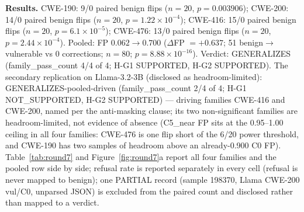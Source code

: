 \textbf{Results.} CWE-190: 9/0 paired benign flips ($n{=}20$, $p=0.003906$); CWE-200: 14/0 paired benign flips ($n{=}20$, $p=1.22{\times}10^{-4}$); CWE-416: 15/0 paired benign flips ($n{=}20$, $p=6.1{\times}10^{-5}$); CWE-476: 13/0 paired benign flips ($n{=}20$, $p=2.44{\times}10^{-4}$).
Pooled: FP $0.062\rightarrow0.700$ ($\Delta$FP $=+0.637$; 51 benign$\to$vulnerable vs 0 corrections; $n{=}80$; $p=8.88{\times}10^{-16}$).
Verdict: GENERALIZES (family\_pass\_count 4/4 of 4; H-G1 SUPPORTED, H-G2 SUPPORTED).
The secondary replication on Llama-3.2-3B (disclosed as headroom-limited):
GENERALIZES-pooled-driven (family\_pass\_count 2/4 of 4; H-G1 NOT\_SUPPORTED, H-G2 SUPPORTED) ---
driving families CWE-416 and CWE-200, named per the anti-masking clause; its
two non-significant families are headroom-limited, not evidence of absence
(C5\_near FP sits at the 0.95--1.00 ceiling in all four families: CWE-476 is
one flip short of the 6/20 power threshold, and CWE-190 has two samples of
headroom above an already-0.900 C0 FP).
Table~\ref{tab:round7} and Figure~\ref{fig:round7}a report all four
families and the pooled row side by side; refusal rate is reported
separately in every cell (refusal is never mapped to benign); one PARTIAL
record (sample 198370, Llama CWE-200 vul/C0, unparsed JSON) is excluded
from the paired count and disclosed rather than mapped to a verdict.

